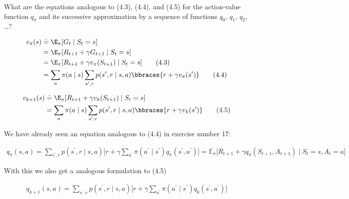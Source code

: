 \begin{exercise}
What are the equations analogous to (4.3), (4.4), and (4.5) for the action-value function $q_\pi$ and its successive approximation by a sequence of functions $q_0$, $q_1$, $q_2$, \dots?

\begin{align*} %
    v_\pi(s)
    & \doteq
    \E_\pi[G_t \mid S_t = s] \\
    & =
    \E_\pi[R_{t+1} + \gamma G_{t+1} \mid S_t = s] \\
    & =
    \E_\pi[R_{t+1} + \gamma v_\pi(S_{t+1}) \mid S_t = s] \tag{4.3} \\
    & =
    \sum_a
        \pi(a \mid s)
        \sum_{s^\prime, r}
            p(s^\prime, r \mid s, a)
            \bbraces{r + \gamma v_\pi(s^\prime)} \tag{4.4}
\end{align*}

\begin{align*}
    v_{k+1}(s)
    & \doteq
    \E_\pi[R_{t+1} + \gamma v_k(S_{t+1}) \mid S_t = s] \\
    & =
    \sum_a
        \pi(a \mid s)
        \sum_{s^\prime, r}
            p(s^\prime, r \mid s, a)
            \bbraces{r + \gamma v_k(s^\prime)} \tag{4.5}
\end{align*}

\end{exercise}

\begin{solution}
  We have already seen an equation analogous to (4.4) in exercise number 17:

  \begin{align*}
    q_\pi(s,a)
    =
    \sum_{s^\prime, r} p(s^\prime, r \mid s,a) \Big[r + \gamma \sum_{a^\prime}\pi(a^\prime\mid s^\prime)q_\pi(s^\prime,a^\prime)\Big]
    =
    \mathbb{E}_\pi\Big[R_{t+1} + \gamma  q_\pi(S_{t+1},A_{t+1})\mid S_t = s, A_t  = a\Big]
  \end{align*}

  With this we also get a analogous formulation to (4.5)

  \begin{align*}
    q_{k+1}(s,a)
    =
    \sum_{s^\prime, r} p(s^\prime, r \mid s,a) \Big[r + \gamma \sum_{a^\prime}\pi(a^\prime\mid s^\prime)q_k(s^\prime,a^\prime)\Big]
  \end{align*}
\end{solution}
